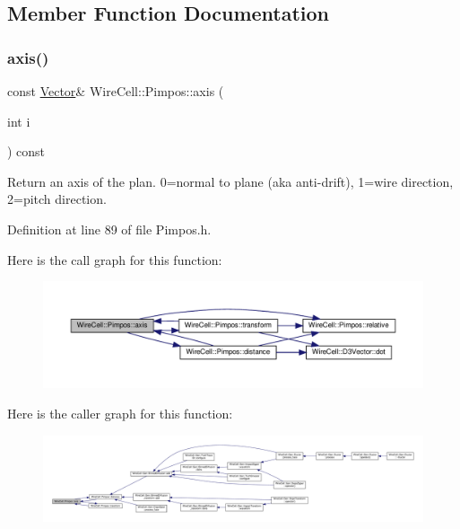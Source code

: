 \subsection{Member Function Documentation}
\mbox{\label{class_wire_cell_1_1_pimpos_a0eed2ce13249e92b343e94e0ecaa3953}} 
\subsubsection{\texorpdfstring{axis()}{axis()}}
{\footnotesize\ttfamily const \hyperlink{namespace_wire_cell_aa3c82d3ba85f032b0d278b7004846800}{Vector}\& Wire\+Cell\+::\+Pimpos\+::axis (\begin{DoxyParamCaption}\item[{int}]{i }\end{DoxyParamCaption}) const\hspace{0.3cm}{\ttfamily [inline]}}

Return an axis of the plan. 0=normal to plane (aka anti-\/drift), 1=wire direction, 2=pitch direction. 

Definition at line 89 of file Pimpos.\+h.

Here is the call graph for this function\+:
\nopagebreak
\begin{figure}[H]
\begin{center}
\leavevmode
\includegraphics[width=350pt]{class_wire_cell_1_1_pimpos_a0eed2ce13249e92b343e94e0ecaa3953_cgraph}
\end{center}
\end{figure}
Here is the caller graph for this function\+:
\nopagebreak
\begin{figure}[H]
\begin{center}
\leavevmode
\includegraphics[width=350pt]{class_wire_cell_1_1_pimpos_a0eed2ce13249e92b343e94e0ecaa3953_icgraph}
\end{center}
\end{figure}
\mbox{\label{class_wire_cell_1_1_pimpos_ae3a8be480718c7cf1ad0551947591fc3}} 
